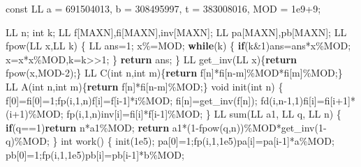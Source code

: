\documentclass[
]{article}
\newenvironment{Shaded}{}{}
\newcommand{\AttributeTok}[1]{\textcolor[rgb]{0.49,0.56,0.16}{#1}}
\newcommand{\ControlFlowTok}[1]{\textcolor[rgb]{0.00,0.44,0.13}{\textbf{#1}}}
\newcommand{\DataTypeTok}[1]{\textcolor[rgb]{0.56,0.13,0.00}{#1}}
\newcommand{\DecValTok}[1]{\textcolor[rgb]{0.25,0.63,0.44}{#1}}
\newcommand{\FloatTok}[1]{\textcolor[rgb]{0.25,0.63,0.44}{#1}}
\newcommand{\NormalTok}[1]{#1}
\begin{document}
\begin{Shaded}
\begin{Highlighting}[]
\AttributeTok{const}\NormalTok{ LL a = }\DecValTok{691504013}\NormalTok{, b = }\DecValTok{308495997}\NormalTok{, t = }\DecValTok{383008016}\NormalTok{, MOD = }\FloatTok{1e9}\NormalTok{+}\DecValTok{9}\NormalTok{;}

\NormalTok{LL n; }\DataTypeTok{int}\NormalTok{ k;}
\NormalTok{LL f[MAXN],fi[MAXN],inv[MAXN];}
\NormalTok{LL pa[MAXN],pb[MAXN];}
\NormalTok{LL fpow(LL x,LL k)}
\NormalTok{\{}
\NormalTok{    LL ans=}\DecValTok{1}\NormalTok{; x\%=MOD;}
    \ControlFlowTok{while}\NormalTok{(k)}
\NormalTok{    \{}
        \ControlFlowTok{if}\NormalTok{(k\&}\DecValTok{1}\NormalTok{)ans=ans*x\%MOD;}
\NormalTok{        x=x*x\%MOD,k=k\textgreater{}\textgreater{}}\DecValTok{1}\NormalTok{;}
\NormalTok{    \}}
    \ControlFlowTok{return}\NormalTok{ ans;}
\NormalTok{\}}
\NormalTok{LL get\_inv(LL x)\{}\ControlFlowTok{return}\NormalTok{ fpow(x,MOD{-}}\DecValTok{2}\NormalTok{);\}}
\NormalTok{LL C(}\DataTypeTok{int}\NormalTok{ n,}\DataTypeTok{int}\NormalTok{ m)\{}\ControlFlowTok{return}\NormalTok{ f[n]*fi[n{-}m]\%MOD*fi[m]\%MOD;\}}
\NormalTok{LL A(}\DataTypeTok{int}\NormalTok{ n,}\DataTypeTok{int}\NormalTok{ m)\{}\ControlFlowTok{return}\NormalTok{ f[n]*fi[n{-}m]\%MOD;\}}
\DataTypeTok{void}\NormalTok{ init(}\DataTypeTok{int}\NormalTok{ n)}
\NormalTok{\{}
\NormalTok{    f[}\DecValTok{0}\NormalTok{]=fi[}\DecValTok{0}\NormalTok{]=}\DecValTok{1}\NormalTok{;fp(i,}\DecValTok{1}\NormalTok{,n)f[i]=f[i{-}}\DecValTok{1}\NormalTok{]*i\%MOD;}
\NormalTok{    fi[n]=get\_inv(f[n]);}
\NormalTok{    fd(i,n{-}}\DecValTok{1}\NormalTok{,}\DecValTok{1}\NormalTok{)fi[i]=fi[i+}\DecValTok{1}\NormalTok{]*(i+}\DecValTok{1}\NormalTok{)\%MOD;}
\NormalTok{    fp(i,}\DecValTok{1}\NormalTok{,n)inv[i]=fi[i]*f[i{-}}\DecValTok{1}\NormalTok{]\%MOD;}
\NormalTok{\}}
\NormalTok{LL sum(LL a1, LL q, LL n)}
\NormalTok{\{}
    \ControlFlowTok{if}\NormalTok{(q==}\DecValTok{1}\NormalTok{)}\ControlFlowTok{return}\NormalTok{ n*a1\%MOD;}
    \ControlFlowTok{return}\NormalTok{ a1*(}\DecValTok{1}\NormalTok{{-}fpow(q,n))\%MOD*get\_inv(}\DecValTok{1}\NormalTok{{-}q)\%MOD;}
\NormalTok{\}}
\DataTypeTok{int}\NormalTok{ work()}
\NormalTok{\{}
\NormalTok{    init(}\FloatTok{1e5}\NormalTok{);}
\NormalTok{    pa[}\DecValTok{0}\NormalTok{]=}\DecValTok{1}\NormalTok{;fp(i,}\DecValTok{1}\NormalTok{,}\FloatTok{1e5}\NormalTok{)pa[i]=pa[i{-}}\DecValTok{1}\NormalTok{]*a\%MOD;}
\NormalTok{    pb[}\DecValTok{0}\NormalTok{]=}\DecValTok{1}\NormalTok{;fp(i,}\DecValTok{1}\NormalTok{,}\FloatTok{1e5}\NormalTok{)pb[i]=pb[i{-}}\DecValTok{1}\NormalTok{]*b\%MOD;}

\end{Highlighting}
\end{Shaded}
\end{document}
